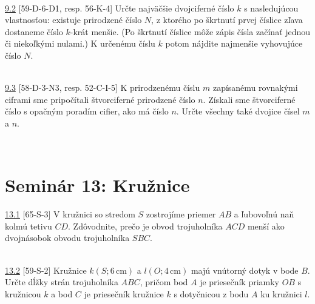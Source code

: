\\

\noindent \ul{9.2} [59-D-6-D1, resp. 56-K-4] Určte najväčšie dvojciferné číslo $k$ s nasledujúcou vlastnosťou: existuje prirodzené číslo $N$, z ktorého po škrtnutí prvej číslice zľava dostaneme číslo $k$-krát menšie. (Po škrtnutí číslice môže zápis čísla začínať jednou či niekoľkými nulami.) K určenému číslu $k$ potom nájdite najmenšie vyhovujúce číslo $N$.


\\

\noindent \ul{9.3} [58-D-3-N3, resp. 52-C-I-5] K prirodzenému číslu $m$ zapísanému rovnakými ciframi sme pripočítali štvorciferné prirodzené číslo $n$. Získali sme štvorciferné číslo s opačným poradím cifier, ako má číslo $n$. Určte všechny také dvojice čísel $m$ a $n$.


\\

\section*{Seminár 13: Kružnice}

\noindent \ul{13.1} [65-S-3] V kružnici so stredom $S$ zostrojíme priemer $AB$ a ľubovoľnú naň kolmú tetivu $CD$. Zdôvodnite, prečo je obvod trojuholníka $ACD$ menší ako dvojnásobok obvodu trojuholníka $SBC$.


\\

\noindent \ul{13.2} [59-S-2] Kružnice $k(S; 6\,\text{cm})$ a $l(O; 4\,\text{cm})$ majú vnútorný dotyk v bode $B$. Určte dĺžky strán trojuholníka $ABC$, pričom bod $A$ je priesečník priamky $OB$ s kružnicou $k$ a bod $C$ je priesečník kružnice $k$ s dotyčnicou z bodu $A$ ku kružnici $l$.


\\

